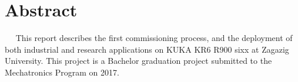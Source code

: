 \chapter*{Abstract}\label{ch:abstract}
%
%
\setlength{\parindent}{1em}
  
This report describes the first commissioning process, and the deployment of both industrial and research applications on KUKA KR6 R900 sixx at Zagazig University. This project is a Bachelor graduation project submitted to the Mechatronics Program on 2017.%

